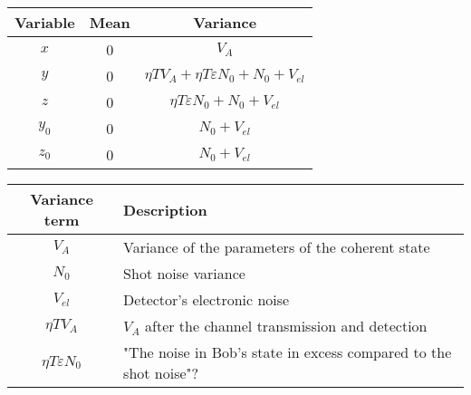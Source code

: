 \documentclass[5pt]{article}
\begin{document}
\begin{center}
	\begin{tabular}{c c c}
		\hline
		\textbf{Variable}	& \textbf{Mean}		& \textbf{Variance}\\
		\hline
		$x$					& 0					& $V_A$\\
		$y$					& 0					& $\eta T V_A + \eta T \varepsilon N_0 + N_0 + V_{el}$\\
		$z$					& 0					& $\eta T \varepsilon N_0 + N_0 + V_{el}$\\
		$y_0$				& 0					& $N_0 + V_{el}$\\
		$z_0$				& 0					& $N_0 + V_{el}$\\
		\hline
	\end{tabular}
\end{center}

\vspace{1em}

\begin{center}
	\begin{tabular}{c p{12cm}}
		\hline
		\textbf{Variance term}		& \textbf{Description}\\	
		\hline
		$V_A$						& \small{Variance of the parameters of the coherent state}\\ 
		$N_0$						& \small{Shot noise variance}\\
		$V_{el}$					& \small{Detector's electronic noise}\\
		$\eta T V_A$				& \small{$V_A$ after the channel transmission and detection}\\ 
		$\eta T \varepsilon N_0$	& \small{"The noise in Bob's state in excess compared to the shot noise"?}\\
		\hline
	\end{tabular}
\end{center}
\end{document}
